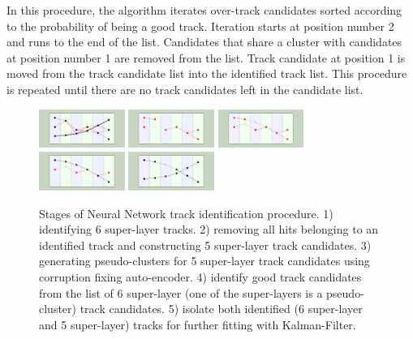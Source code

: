 \documentclass[aps,prl,preprint,12pt]{elsarticle}
\begin{document}
In this procedure, the algorithm iterates over-track candidates sorted according to the probability of 
being a good track. Iteration starts at position number 2 and runs to the end of the list. Candidates that 
share a cluster with candidates at position number 1 are removed from the list. Track candidate at position 
1 is moved from the track candidate list into the identified track list. This procedure is repeated until 
there are no track candidates left in the candidate list.

 \begin{figure}[!h]
\begin{center}
 \includegraphics[angle=90,width=1.1in]{images/iden_6_sl.pdf}
  \includegraphics[angle=90,width=1.1in]{images/iden_5_sl_a.pdf}
    \includegraphics[angle=90,width=1.1in]{images/iden_5_sl_b.pdf}
      \includegraphics[angle=90,width=1.1in]{images/iden_5_sl_c.pdf}
            \includegraphics[angle=90,width=1.1in]{images/iden_5_sl_d.pdf}
            
\caption {Stages of Neural Network track identification procedure. 1) identifying 6 super-layer tracks. 2) 
removing all hits belonging to an identified track and constructing 5 super-layer track candidates. 
3) generating pseudo-clusters for 5 super-layer track candidates using corruption fixing auto-encoder. 
4) identify good track candidates from the list of 6 super-layer (one of the super-layers is a pseudo-cluster) 
track candidates. 5) isolate both identified (6 super-layer and 5 super-layer) tracks  for further fitting with 
Kalman-Filter.}
 \label{network:procedure}
 \end{center}
\end{figure}
\end{document}
